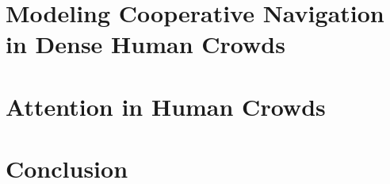 \documentclass[twoside,10pt]{report}
\begin{document}
\chapter{Modeling Cooperative Navigation in Dense Human Crowds}
\label{chap:oigp}


\clearpage

\chapter{Attention in Human Crowds}
\label{chap:attn}


\clearpage

\chapter{Conclusion}
\label{chap:conclusion}



% 
{\small }
\end{document}
